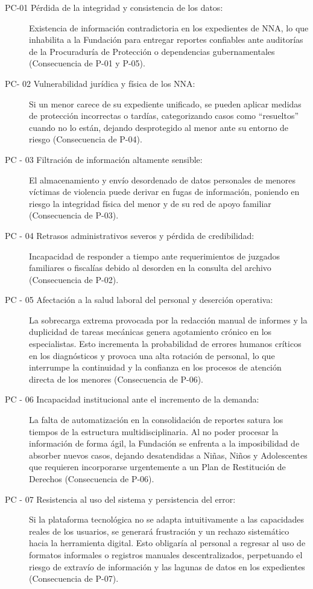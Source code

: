 \begin{description}
	\item[PC-01 Pérdida de la integridad y consistencia de los datos:] Existencia de información contradictoria en los expedientes de NNA, lo que inhabilita a la Fundación para entregar reportes confiables ante auditorías de la Procuraduría de Protección o dependencias gubernamentales (Consecuencia de P-01 y P-05).
	\item[PC- 02 Vulnerabilidad jurídica y física de los NNA:] Si un menor carece de su expediente unificado, se pueden aplicar medidas de protección incorrectas o tardías, categorizando casos como ``resueltos'' cuando no lo están, dejando desprotegido al menor ante su entorno de riesgo (Consecuencia de P-04).
	\item[PC - 03 Filtración de información altamente sensible:] El almacenamiento y envío desordenado de datos personales de menores víctimas de violencia puede derivar en fugas de información, poniendo en riesgo la integridad física del menor y de su red de apoyo familiar (Consecuencia de P-03).
	\item[PC - 04 Retrasos administrativos severos y pérdida de credibilidad:] Incapacidad de responder a tiempo ante requerimientos de juzgados familiares o fiscalías debido al desorden en la consulta del archivo (Consecuencia de P-02).
	\item[PC - 05 Afectación a la salud laboral del personal y deserción operativa:] La sobrecarga extrema provocada por la redacción manual de informes y la duplicidad de tareas mecánicas genera agotamiento crónico en los especialistas. Esto incrementa la probabilidad de errores humanos críticos en los diagnósticos y provoca una alta rotación de personal, lo que interrumpe la continuidad y la confianza en los procesos de atención directa de los menores (Consecuencia de P-06).
    \item[PC - 06 Incapacidad institucional ante el incremento de la demanda:] La falta de automatización en la consolidación de reportes satura los tiempos de la estructura multidisciplinaria. Al no poder procesar la información de forma ágil, la Fundación se enfrenta a la imposibilidad de absorber nuevos casos, dejando desatendidas a Niñas, Niños y Adolescentes que requieren incorporarse urgentemente a un Plan de Restitución de Derechos (Consecuencia de P-06).
    \item[PC - 07 Resistencia al uso del sistema y persistencia del error:] Si la plataforma tecnológica no se adapta intuitivamente a las capacidades reales de los usuarios, se generará frustración y un rechazo sistemático hacia la herramienta digital. Esto obligaría al personal a regresar al uso de formatos informales o registros manuales descentralizados, perpetuando el riesgo de extravío de información y las lagunas de datos en los expedientes (Consecuencia de P-07).
\end{description}

